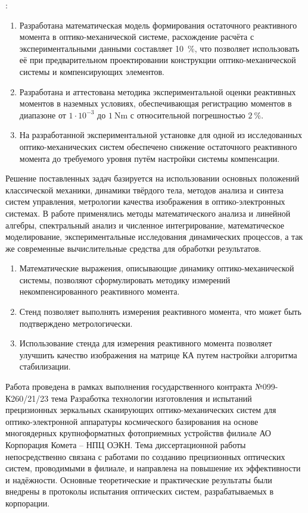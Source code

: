{\influence}:

\begin{enumerate}[beginpenalty=10000] %
	\item Разработана математическая модель формирования остаточного реактивного момента в оптико-механической системе, расхождение расчёта с экспериментальными данными составляет 10~\%, что позволяет использовать её при предварительном проектировании конструкции оптико-механической системы и компенсирующих элементов.
	\item Разработана и аттестована методика экспериментальной оценки реактивных моментов в наземных условиях, обеспечивающая регистрацию моментов в диапазоне от $1 \cdot 10^{-3}$ до $\SI{1}{\newton\meter}$ с относительной погрешностью $2 ~\%$.
	\item На разработанной экспериментальной установке для одной из исследованных оптико-механических систем обеспечено снижение остаточного реактивного момента до требуемого уровня путём настройки системы компенсации.
\end{enumerate}


{\methods} Решение поставленных задач базируется на использовании основных положений классической механики, динамики твёрдого тела, методов анализа и синтеза систем управления, метрологии качества изображения в оптико-электронных системах. В работе применялись методы математического анализа и линейной алгебры, спектральный анализ и численное интегрирование, математическое моделирование, экспериментальные исследования динамических процессов, а так же современные вычислительные средства для обработки результатов.


{}
\begin{enumerate}[beginpenalty=10000] %
  \item Математические выражения, описывающие динамику оптико-механической системы, позволяют сформулировать методику измерений некомпенсированного реактивного момента.
  \item Стенд позволяет выполнять измерения реактивного момента, что может быть подтверждено метрологически.
  \item Использование стенда для измерения реактивного момента позволяет улучшить качество изображения на матрице КА путем настройки алгоритма стабилизации.
\end{enumerate}

{\realisation} Работа проведена в рамках выполнения государственного контракта №099-К260/21/23 тема \flqq Разработка технологии изготовления и испытаний прецизионных зеркальных сканирующих оптико-механических систем для оптико-электронной аппаратуры космического базирования на основе многоядерных крупноформатных фотоприемных устройств\frqq  в филиале АО \flqq Корпорация \glqq Комета \grqq -- \glqq НПЦ ОЭКН\grqq \frqq. Тема диссертационной работы непосредственно связана с работами по созданию прецизионных оптических систем, проводимыми в филиале, и направлена на повышение их эффективности и надёжности. Основные теоретические и практические результаты были внедрены в протоколы испытания оптических систем, разрабатываемых в корпорации.

